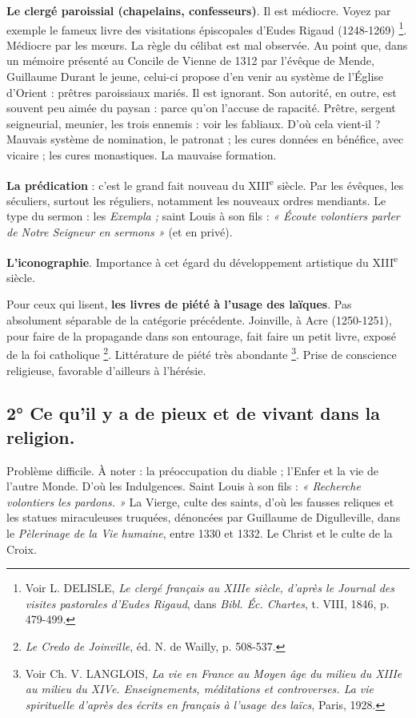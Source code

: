 \documentclass[french,twoside]{book} %
\begin{document}
\begin{listalpha}[itemsep=0pt,]
\item {\bfseries Le clergé paroissial (chapelains, confesseurs)}. Il est médiocre. Voyez par exemple le fameux livre des visitations épiscopales d’Eudes Rigaud (1248-1269) \footnote{ Voir L. DELISLE, {\itshape Le clergé français au XIIIe siècle, d’après le Journal des visites pastorales d’Eudes Rigaud}, dans {\itshape Bibl. Éc. Chartes}, t. VIII, 1846, p. 479-499.}. Médiocre par les mœurs. La règle du célibat est mal observée. Au point que, dans un mémoire présenté au Concile de Vienne de 1312 par l’évêque de Mende, Guillaume Durant le jeune, celui-ci propose d’en venir au système de l’Église d’Orient : prêtres paroissiaux mariés. Il est ignorant. Son autorité, en outre, est souvent peu aimée du paysan : parce qu’on l’accuse de rapacité. Prêtre, sergent seigneurial, meunier, les trois ennemis : voir les fabliaux. D’où cela vient-il ? Mauvais système de nomination, le patronat ; les cures données en bénéfice, avec vicaire ; les cures monastiques. La mauvaise formation.
\item {\bfseries La prédication} : c’est le grand fait nouveau du XIII\textsuperscript{e} siècle. Par les évêques, les séculiers, surtout les réguliers, notamment les nouveaux ordres mendiants. Le type du sermon : les {\itshape Exempla ;} saint Louis à son fils : \emph{« Écoute volontiers parler de Notre Seigneur en sermons »} (et en privé).
\item {\bfseries L’iconographie}. Importance à cet égard du développement artistique du XIII\textsuperscript{e} siècle.
\item Pour ceux qui lisent, {\bfseries les livres de piété à l’usage des laïques}. Pas absolument séparable de la catégorie précédente. Joinville, à Acre (1250-1251), pour faire de la propagande dans son entourage, fait faire un petit livre, exposé de la foi catholique \footnote{{\itshape Le Credo de Joinville}, éd. N. de Wailly, p. 508-537.}. Littérature de piété très abondante \footnote{ Voir Ch. V. LANGLOIS, {\itshape La vie en France au Moyen âge du milieu du XIIIe au milieu du XIVe. Enseignements, méditations et controverses. La vie spirituelle d’après des écrits en français à l’usage des laïcs}, Paris, 1928.}. Prise de conscience religieuse, favorable d’ailleurs à l’hérésie.

\end{listalpha}\subsection[2° Ce qu’il y a de pieux et de vivant dans la religion.]{2° Ce qu’il y a de pieux et de vivant dans la religion.}
\noindent Problème difficile. À noter : la préoccupation du diable ; l’Enfer et la vie de l’autre Monde. D’où les Indulgences. Saint Louis à son fils : \emph{« Recherche volontiers les pardons. »} La Vierge, culte des saints, d’où les fausses reliques et les statues miraculeuses truquées, dénoncées par Guillaume de Digulleville, dans le {\itshape Pèlerinage de la Vie humaine}, entre 1330 et 1332. Le Christ et le culte de la Croix.
\end{document}
